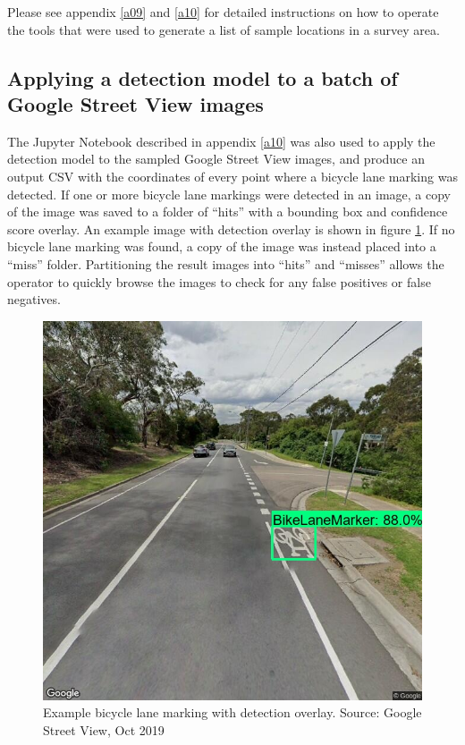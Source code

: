 \documentclass[11pt,twoside]{report}
\begin{document}
Please see appendix \ref{a09} and \ref{a10} for detailed instructions on how to operate the tools that were used to generate a list of sample locations in a survey area.


\subsection{Applying a detection model to a batch of Google Street View images}
\label{s:rq2b}

The Jupyter Notebook described in appendix \ref{a10} was also used to apply the detection model to the sampled Google Street View images, and produce an output CSV with the coordinates of every point where a bicycle lane marking was detected.  If one or more bicycle lane markings were detected in an image, a copy of the image was saved to a folder of ``hits'' with a bounding box and confidence score overlay.  An example image with detection overlay is shown in figure \ref{fig:004}.  If no bicycle lane marking was found, a copy of the image was instead placed into a ``miss'' folder.  Partitioning the result images into ``hits'' and ``misses'' allows the operator to quickly browse the images to check for any false positives or false negatives.


\begin{figure}[h!]
\centering
\includegraphics[scale=0.3]{f004_gsv_detection_example.jpg}
\caption{Example bicycle lane marking with detection overlay.  Source: Google Street View, Oct 2019}
\label{fig:004}
\end{figure}
\end{document}
